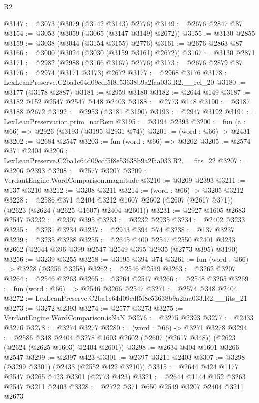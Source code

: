 \begin{lexlean}{R2}
\begin{coremodule}
@3147 := @3073 (@3079 (@3142 @3143) @2776)
@3149 := @2676 @2847 @87
@3154 := @3053 (@3059 (@3065 (@3147 @3149) @2672))
@3155 := @3130 @2855
@3159 := @3038 (@3044 (@3154 @3155) @2776)
@3161 := @2676 @2863 @87
@3166 := @3000 (@3024 (@3030 (@3159 @3161) @2672))
@3167 := @3130 @2871
@3171 := @2982 (@2988 (@3166 @3167) @2776)
@3173 := @2676 @2879 @87
@3176 := @2974 (@3171 @3173) @2672
@3177 := @2968 @3176
@3178 := LexLeanPreserve.C2ba1c64d09cdf5f8e53638b9a2faa033.R2.__rel_20
@3180 := @3177 (@3178 @2887)
@3181 := @2959 @3180
@3182 := @2644 @149
@3187 := @3182 @152 @2547 @2547 @148 @2403
@3188 := @2773 @148
@3190 := @3187 @3188 @2672
@3192 := @2953 (@3181 @3190)
@3193 := @2947 @3192
@3194 := LexLeanPreservation.prim_natRem
@3195 := @3194 @2393
@3200 := fun (a : @66) => @2926 (@3193 (@3195 @2931 @74))
@3201 := (word : @66) -> @2431
@3202 := @2684 @2547
@3203 := fun (word : @66) => @3202
@3205 := @2574 @371 @2404
@3206 := LexLeanPreserve.C2ba1c64d09cdf5f8e53638b9a2faa033.R2.__fits_22
@3207 := @3206 @2393
@3208 := @2577 @3207
@3209 := VerdantEngine.WordComparison.magnitude
@3210 := @3209 @2393
@3211 := @137 @3210
@3212 := @3208 @3211
@3214 := (word : @66) -> @3205 @3212
@3228 := @2586
    @371
    @2404
    @3212
    @1607
    @2602
    (@2607 (@2617 @371))
    (@2623 (@2624 (@2625 @1607) @2404 @2601))
@3231 := @2927 @1605 @2683 @2547
@3232 := @2397 @395
@3233 := @3232 @2935
@3234 := @2402 @3233
@3235 := @3231 @3234
@3237 := @2943 @394 @74
@3238 := @137 @3237
@3239 := @3235 @3238
@3255 := @2645
    @400
    @2547
    @2550
    @2401
    @3233
    @2662
    (@2644 @396 @399 @2547 @2549 @395 @2935 (@2773 @395) @3190)
@3256 := @3239 @3255
@3258 := @3195 @394 @74
@3261 := fun (word : @66) => @3228 (@3256 @3258)
@3262 := @2546 @2549
@3263 := @3262 @3207
@3264 := @2546 @3263
@3265 := @3264 @2547
@3266 := @2548 @3265
@3269 := fun (word : @66) => @2546 @3266 @2547
@3271 := @2574 @348 @2404
@3272 := LexLeanPreserve.C2ba1c64d09cdf5f8e53638b9a2faa033.R2.__fits_21
@3273 := @3272 @2393
@3274 := @2577 @3273
@3275 := VerdantEngine.WordComparison.isNaN
@3276 := @3275 @2393
@3277 := @2433 @3276
@3278 := @3274 @3277
@3280 := (word : @66) -> @3271 @3278
@3294 := @2586
    @348
    @2404
    @3278
    @1603
    @2602
    (@2607 (@2617 @348))
    (@2623 (@2624 (@2625 @1603) @2404 @2601))
@3298 := @2634 @404 @1601 @3266 @2547
@3299 := @2397 @423
@3301 := @2397 @3211 @2403
@3307 := @3298 (@3299 @3301) (@2433 (@2552 @422 @3210))
@3315 := @2644 @424 @1177 @2547 @3265 @423 @3301 (@2773 @423)
@3321 := @2644 @1144 @152 @3263 @2547 @3211 @2403
@3328 := @2722 @371 @650 @2549 @3207 @2404 @3211 @2673

\end{coremodule}
\end{lexlean}
